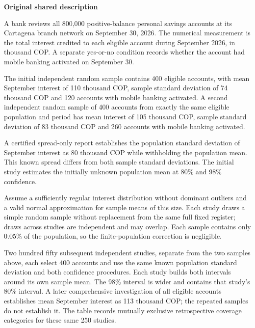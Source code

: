 \clearpage


\textbf{Original shared description}

A bank reviews all 800,000 positive-balance personal savings accounts at its Cartagena branch network on September 30, 2026. The numerical measurement is the total interest credited to each eligible account during September 2026, in thousand COP. A separate yes-or-no condition records whether the account had mobile banking activated on September 30.

The initial independent random sample contains 400 eligible accounts, with mean September interest of 110 thousand COP, sample standard deviation of 74 thousand COP and 120 accounts with mobile banking activated. A second independent random sample of 400 accounts from exactly the same eligible population and period has mean interest of 105 thousand COP, sample standard deviation of 83 thousand COP and 260 accounts with mobile banking activated.

A certified spread-only report establishes the population standard deviation of September interest as 80 thousand COP while withholding the population mean. This known spread differs from both sample standard deviations. The initial study estimates the initially unknown population mean at 80\% and 98\% confidence.

Assume a sufficiently regular interest distribution without dominant outliers and a valid normal approximation for sample means of this size. Each study draws a simple random sample without replacement from the same full fixed register; draws across studies are independent and may overlap. Each sample contains only 0.05\% of the population, so the finite-population correction is negligible.

Two hundred fifty subsequent independent studies, separate from the two samples above, each select 400 accounts and use the same known population standard deviation and both confidence procedures. Each study builds both intervals around its own sample mean. The 98\% interval is wider and contains that study's 80\% interval. A later comprehensive investigation of all eligible accounts establishes mean September interest as 113 thousand COP; the repeated samples do not establish it. The table records mutually exclusive retrospective coverage categories for these same 250 studies.


